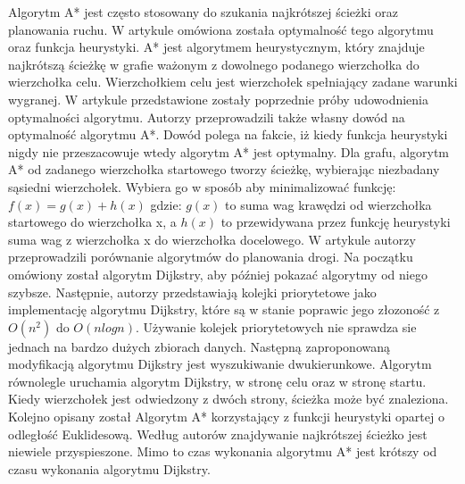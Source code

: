 \indent
Algorytm A* jest często stosowany do szukania najkrótszej ścieżki oraz planowania ruchu. W artykule \cite{dechter1985generalized} omówiona została optymalność tego algorytmu oraz funkcja heurystyki. A* jest algorytmem heurystycznym, który znajduje najkrótszą ścieżkę w grafie ważonym z dowolnego podanego wierzchołka do wierzchołka celu. Wierzchołkiem celu jest wierzchołek spełniający zadane warunki wygranej. W artykule przedstawione zostały poprzednie próby udowodnienia optymalności algorytmu. Autorzy przeprowadzili także własny dowód na optymalność algorytmu A*. Dowód polega na fakcie, iż kiedy funkcja heurystyki nigdy nie przeszacowuje wtedy algorytm A* jest optymalny. Dla grafu, algorytm A* od zadanego wierzchołka startowego tworzy ścieżkę, wybierając niezbadany sąsiedni wierzchołek. Wybiera go w sposób aby minimalizować funkcję:
\newline
\newline
\begin{math} f(x) = g(x) + h(x)\end{math}
\newline
\newline
gdzie:
\newline
\newline
\begin{math} g(x) \end{math} to suma wag krawędzi od wierzchołka startowego do wierzchołka x, a
\begin{math} h(x) \end{math} to przewidywana przez funkcję heurystyki suma wag z wierzchołka x do wierzchołka docelowego.
\newline
\indent
W artykule \cite{delling2009engineering} autorzy przeprowadzili porównanie algorytmów do planowania drogi. Na początku omówiony został algorytm Dijkstry, aby później pokazać algorytmy od niego szybsze. Następnie, autorzy przedstawiają kolejki priorytetowe jako implementację algorytmu Dijkstry, które są w stanie poprawic jego złozoność z \begin{math} O(n^2) \end{math} do \begin{math} O(nlogn) \end{math}. Używanie kolejek priorytetowych nie sprawdza sie jednach na bardzo dużych zbiorach danych. Następną zaproponowaną modyfikacją algorytmu Dijkstry jest wyszukiwanie dwukierunkowe. Algorytm równolegle uruchamia algorytm Dijkstry, w stronę celu oraz w stronę startu. Kiedy wierzchołek jest odwiedzony z dwóch strony, ścieżka może być znaleziona. Kolejno opisany został Algorytm A* korzystający z funkcji heurystyki opartej o odległość Euklidesową. Według autorów znajdywanie najkrótszej ścieżko jest niewiele przyspieszone. Mimo to czas wykonania algorytmu A* jest krótszy od czasu wykonania algorytmu Dijkstry.
